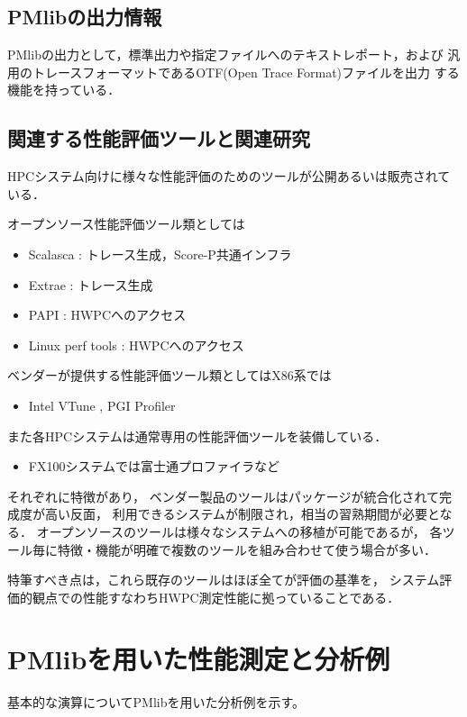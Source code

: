 \documentclass[submit,techrep,noauthor]{ipsj}
\begin{document}
\subsection{PMlibの出力情報}
PMlibの出力として，標準出力や指定ファイルへのテキストレポート，および
汎用のトレースフォーマットであるOTF(Open Trace Format)ファイルを出力
する機能を持っている．


\subsection{関連する性能評価ツールと関連研究}

HPCシステム向けに様々な性能評価のためのツールが公開あるいは販売されている．\par
オープンソース性能評価ツール類としては
\begin{itemize}
	\item Scalasca \cite{Scalasca:2017} : トレース生成，Score-P共通インフラ
	\item Extrae \cite{Extrae:webpage} : トレース生成
	\item PAPI \cite{PAPI:5.6} : HWPCへのアクセス
	\item Linux perf tools : HWPCへのアクセス
\end{itemize}
ベンダーが提供する性能評価ツール類としてはX86系では 
\begin{itemize}
		\item Intel VTune \cite{Intel:VTune}, PGI Profiler \cite{PGI:Profiler}
\end{itemize}
また各HPCシステムは通常専用の性能評価ツールを装備している．
\begin{itemize}
	\item FX100システムでは富士通プロファイラなど
\end{itemize}
それぞれに特徴があり，
ベンダー製品のツールはパッケージが統合化されて完成度が高い反面，
利用できるシステムが制限され，相当の習熟期間が必要となる．
オープンソースのツールは様々なシステムへの移植が可能であるが，
各ツール毎に特徴・機能が明確で複数のツールを組み合わせて使う場合が多い．

特筆すべき点は，これら既存のツールはほぼ全てが評価の基準を，
システム評価的観点での性能すなわちHWPC測定性能に拠っていることである．


\section{PMlibを用いた性能測定と分析例}


基本的な演算についてPMlibを用いた分析例を示す。
\end{document}
